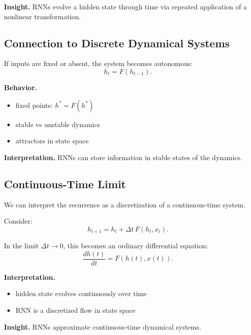\medskip

\noindent
\textbf{Insight.}  
RNNs evolve a hidden state through time via repeated application of a nonlinear transformation.

\subsection{Connection to Discrete Dynamical Systems}

If inputs are fixed or absent, the system becomes autonomous:
\[
h_t = F(h_{t-1}).
\]

\medskip

\noindent
\textbf{Behavior.}

\begin{itemize}
    \item fixed points: $h^* = F(h^*)$
    \item stable vs unstable dynamics
    \item attractors in state space
\end{itemize}

\medskip

\noindent
\textbf{Interpretation.}  
RNNs can store information in stable states of the dynamics.

\subsection{Continuous-Time Limit}

We can interpret the recurrence as a discretization of a continuous-time system.

\medskip

\noindent
Consider:
\[
h_{t+1} = h_t + \Delta t \, F(h_t, x_t).
\]

\medskip

\noindent
In the limit $\Delta t \to 0$, this becomes an ordinary differential equation:
\[
\frac{dh(t)}{dt} = F(h(t), x(t)).
\]

\medskip

\noindent
\textbf{Interpretation.}

\begin{itemize}
    \item hidden state evolves continuously over time
    \item RNN is a discretized flow in state space
\end{itemize}

\medskip

\noindent
\textbf{Insight.}  
RNNs approximate continuous-time dynamical systems.

